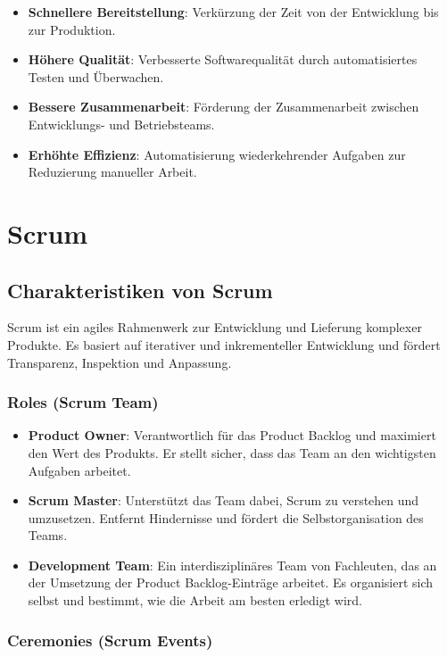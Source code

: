 \begin{itemize}
    \item \textbf{Schnellere Bereitstellung}: Verkürzung der Zeit von der Entwicklung bis zur Produktion.
    \item \textbf{Höhere Qualität}: Verbesserte Softwarequalität durch automatisiertes Testen und Überwachen.
    \item \textbf{Bessere Zusammenarbeit}: Förderung der Zusammenarbeit zwischen Entwicklungs- und Betriebsteams.
    \item \textbf{Erhöhte Effizienz}: Automatisierung wiederkehrender Aufgaben zur Reduzierung manueller Arbeit.
\end{itemize}

\section{Scrum}

\subsection{Charakteristiken von Scrum}

Scrum ist ein agiles Rahmenwerk zur Entwicklung und Lieferung komplexer Produkte. Es basiert auf iterativer und inkrementeller Entwicklung und fördert Transparenz, Inspektion und Anpassung.

\subsubsection{Roles (Scrum Team)}

\begin{itemize}
    \item \textbf{Product Owner}: Verantwortlich für das Product Backlog und maximiert den Wert des Produkts. Er stellt sicher, dass das Team an den wichtigsten Aufgaben arbeitet.
    \item \textbf{Scrum Master}: Unterstützt das Team dabei, Scrum zu verstehen und umzusetzen. Entfernt Hindernisse und fördert die Selbstorganisation des Teams.
    \item \textbf{Development Team}: Ein interdisziplinäres Team von Fachleuten, das an der Umsetzung der Product Backlog-Einträge arbeitet. Es organisiert sich selbst und bestimmt, wie die Arbeit am besten erledigt wird.
\end{itemize}

\subsubsection{Ceremonies (Scrum Events)}

